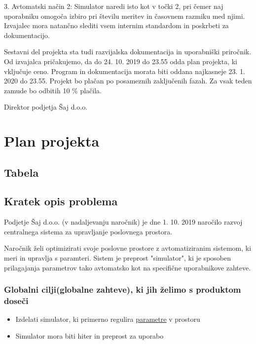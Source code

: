 \documentclass[a4paper,12pt]{article}
\begin{document}
	3. Avtomatski način 2: Simulator naredi isto kot v točki 2, pri čemer 
	naj uporabniku omogoča izbiro pri številu meritev in časovnem razmiku med njimi. 
	Izvajalec mora natančno slediti vsem internim standardom in poskrbeti za dokumentacijo. 
	
	Sestavni del projekta sta tudi razvijalska dokumentacija in uporabniški priročnik. 
	Od izvajalca pričakujemo, da do 24. 10. 2019 do 23.55 odda plan projekta, ki vključuje ceno. 
	Program in dokumentacija morata biti oddana najkasneje 23. 1. 2020 do 23.55. 
	Projekt bo plačan po posameznih zaključenih fazah. Za vsak teden zamude bo odbitih 10 \% plačila. 
	\\
	

	\hfill Direktor podjetja Šaj d.o.o.	

\newpage

\section{Plan projekta}

	\subsection{Tabela}

	\subsection{Kratek opis problema}

		\hspace{1em} Podjetje Šaj d.o.o. (v nadaljevanju naročnik) je dne 1. 10. 2019 naročilo 
		razvoj centralnega sistema za upravljanje poslovnega prostora.
		
		Naročnik želi optimizirati svoje poslovne prostore z avtomatiziranim sistemom, 
		ki meri in upravlja s paramteri. Sistem je preprost "simulator", ki je sposoben 
		prilagajanja parametrov tako avtomatsko kot na specifične uporabnikove zahteve.
		\subsubsection{Globalni cilji(globalne zahteve), ki jih želimo s produktom doseči}

		\begin{itemize}
				\item Izdelati simulator, ki primerno regulira {\hyperlink{subsection.1.8}{\ul{parametre}}} v prostoru
			\item Simulator mora biti hiter in preprost za uporabo
		\end{itemize}
\end{document}
